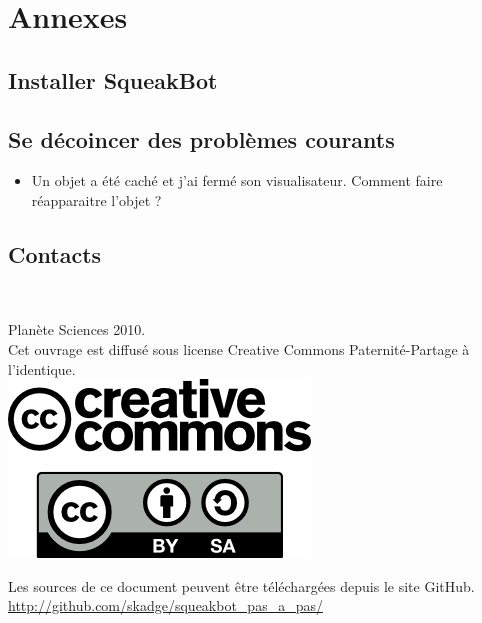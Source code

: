 \documentclass[a4paper,12pt]{book}
\def\appName{SqueakBot}
\begin{document}
\chapter{Annexes}

\section{Installer \appName}

\section{Se décoincer des problèmes courants}

\begin{itemize}
	\item Un objet a été caché et j'ai fermé son visualisateur. Comment faire réapparaitre l'objet ?
\end{itemize}

\section{Contacts}

\printglossaries

\clearpage
~
\vfill
\begin{center}
	Planète Sciences 2010.\\
	Cet ouvrage est diffusé sous license Creative Commons Paternité-Partage à l'identique.\\
	\includegraphics[scale=0.5]{logo_cc.png}
\end{center}

\vfill

\begin{center}
	Les sources de ce document peuvent être téléchargées depuis le site GitHub.
	\url{http://github.com/skadge/squeakbot_pas_a_pas/}
\end{center}

\vfill
\end{document}
